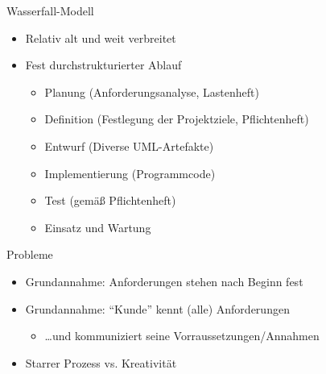 \begin{frame}{Wasserfall-Modell}
	\begin{itemize}
		\item Relativ alt und weit verbreitet
		\item Fest durchstrukturierter Ablauf
		\begin{itemize}
			\item Planung (Anforderungsanalyse, Lastenheft)
			\item Definition (Festlegung der Projektziele, Pflichtenheft)
			\item Entwurf (Diverse UML-Artefakte)
			\item Implementierung (Programmcode)
			\item Test (gemäß Pflichtenheft)
			\item Einsatz und Wartung
		\end{itemize}
	\end{itemize}
	
	\begin{block}{Probleme}
		\begin{itemize}
			\item Grundannahme: Anforderungen stehen nach Beginn fest
			\item Grundannahme: \enquote{Kunde} kennt (alle) Anforderungen
			\begin{itemize}
				\item[] \dots und kommuniziert seine Vorraussetzungen/Annahmen
			\end{itemize}
			\item Starrer Prozess vs. Kreativität
		\end{itemize}
	\end{block}
\end{frame}

